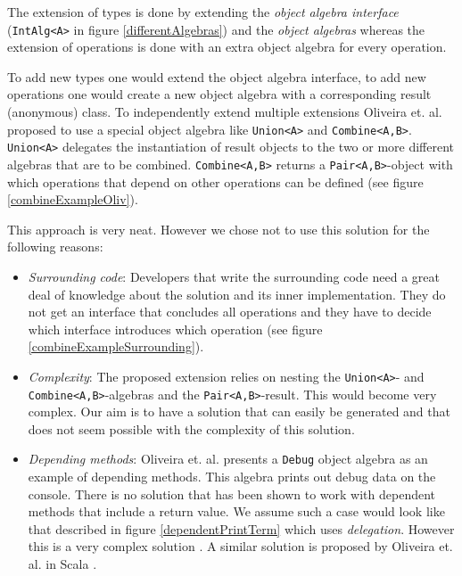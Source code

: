 \documentclass{report}
\begin{document}
The extension of types is done by extending the \emph{object algebra interface} (\lstinline{IntAlg<A>} in figure \ref{differentAlgebras}) and the \emph{object algebras} whereas the extension of operations is done with an extra object algebra for every operation.

To add new types one would extend the object algebra interface, to add new operations one would create a new object algebra with a corresponding result (anonymous) class. To independently extend multiple extensions Oliveira et. al. proposed to use a special object algebra like \lstinline{Union<A>} and \lstinline{Combine<A,B>}. \lstinline{Union<A>} delegates the instantiation of result objects to the two or more different algebras that are to be combined. \lstinline{Combine<A,B>} returns a \lstinline{Pair<A,B>}-object with which operations that depend on other operations can be defined (see figure \ref{combineExampleOliv}).

This approach is very neat. However we chose not to use this solution for the following reasons:

\begin{itemize}
  \item \emph{Surrounding code}: Developers that write the surrounding code need a great deal of knowledge about the solution and its inner implementation. They do not get an interface that concludes all operations and they have to decide which interface introduces which operation (see figure \ref{combineExampleSurrounding}).
  \item \emph{Complexity}: The proposed extension relies on nesting the \lstinline{Union<A>}- and \lstinline{Combine<A,B>}-algebras and the \lstinline{Pair<A,B>}-result. This would become very complex. Our aim is to have a solution that can easily be generated and that does not seem possible with the complexity of this solution.
  \item \emph{Depending methods}: Oliveira et. al. presents a \lstinline{Debug} object algebra as an example of depending methods. This algebra prints out debug data on the console. There is no solution that has been shown to work with dependent methods that include a return value. We assume such a case would look like that described in figure \ref{dependentPrintTerm} which uses \emph{delegation}. However this is a very complex solution \cite{Tempero-Multiple-2000}. A similar solution is proposed by Oliveira et. al. in Scala \cite{Oliv-Feature-2013}.
\end{itemize}
\end{document}

